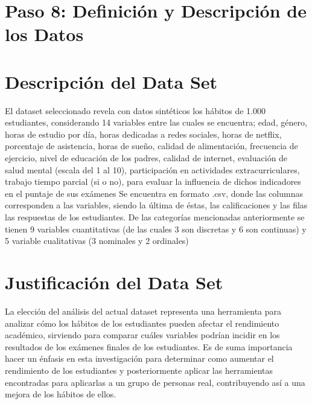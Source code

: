 \documentclass[12pt,letterpaper]{report}
\begin{document}
\section{Paso 8: Definición y Descripción de los Datos}

\section{Descripción del Data Set}
El dataset seleccionado revela con datos sintéticos los hábitos de 1.000 estudiantes, considerando 14 variables entre las cuales se encuentra; edad, género, horas de estudio por día, horas dedicadas a redes sociales, horas de netflix, porcentaje de asistencia, horas de sueño, calidad de alimentación, frecuencia de ejercicio, nivel de educación de los padres, calidad de internet, evaluación de salud mental (escala del 1 al 10), participación en actividades extracurriculares, trabajo tiempo parcial (si o no), para evaluar la influencia de dichos indicadores en el puntaje de sus exámenes
Se encuentra en formato .csv, donde las columnas corresponden a las variables, siendo la última de éstas, las calificaciones y las filas las respuestas de los estudiantes. De las categorías mencionadas anteriormente se tienen 9 variables cuantitativas (de las cuales 3 son discretas y 6 son continuas) y 5 variable cualitativas (3 nominales y 2 ordinales)

\section{Justificación del Data Set}
La elección del análisis del actual dataset representa una herramienta para analizar cómo los hábitos de los estudiantes pueden afectar el rendimiento académico, sirviendo para comparar cuáles variables podrían incidir en los resultados de los exámenes finales de los estudiantes. Es de suma importancia hacer un énfasis en esta investigación para determinar como aumentar el rendimiento de los estudiantes y posteriormente aplicar las herramientas encontradas para aplicarlas a un grupo de personas real, contribuyendo así a una mejora de los hábitos de ellos.
\end{document}
